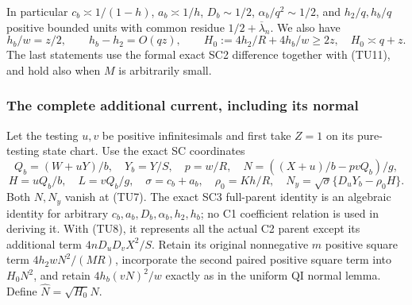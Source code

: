 In particular $c_b\asymp1/(1-h)$, $a_b\asymp1/h$,
$D_b\sim1/2$, $\alpha_b/q^2\sim1/2$, and
$h_2/q,h_b/q$ positive bounded units with common residue
$1/2+\overline\lambda_n$.  We also have
\[
 h_b/w=z/2,\qquad h_b-h_2=O(qz),\qquad
 H_0:=4h_2/R+4h_b/w\geq2z,
 \quad H_0\asymp q+z.                                  \tag{TU13}
\]
The last statements use the formal exact SC2 difference together
with (TU11), and hold also when $M$ is arbitrarily small.

\subsubsection*{The complete additional current, including its normal}

Let the testing $u,v$ be positive infinitesimals and first take
$Z=1$ on its pure-testing state chart.  Use the exact SC coordinates
\[
 Q_b=(W+uY)/b,\quad Y_b=Y/S,\quad p=w/R,\quad
 N=((X+u)/b-pvQ_b)/g,
\]
\[
 H=uQ_b/b,\quad L=vQ_b/g,\quad
 \sigma=c_b+a_b,\quad \rho_0=Kh/R,\quad
 N_y=\sqrt\sigma\{D_uY_b-\rho_0H\}.
                                                               \tag{TU14}
\]
Both $N,N_y$ vanish at (TU7).  The exact SC3 full-parent identity
is an algebraic identity for arbitrary $c_b,a_b,D_b,\alpha_b,h_2,h_b$;
no C1 coefficient relation is used in deriving it.  With (TU8),
it represents all the actual C2 parent except its additional term
$4nD_uD_vX^2/S$.  Retain its original nonnegative $m$ positive square term
$4h_2wN^2/(MR)$, incorporate the second paired positive square term into
$H_0N^2$, and retain $4h_b(vN)^2/w$ exactly as in the uniform
QI normal lemma.  Define $\widehat N=\sqrt{H_0}N$.

